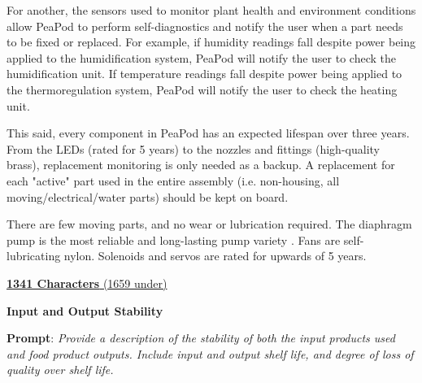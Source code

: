 \documentclass{report}
\begin{document}
For another, the sensors used to monitor plant health and environment conditions allow PeaPod to perform self-diagnostics and notify the user when a part needs to be fixed or replaced. For example, if humidity readings fall despite power being applied to the humidification system, PeaPod will notify the user to check the humidification unit. If temperature readings fall despite power being applied to the thermoregulation system, PeaPod will notify the user to check the heating unit.

This said, every component in PeaPod has an expected lifespan over three years. From the LEDs (rated for 5 years) to the nozzles and fittings (high-quality brass), replacement monitoring is only needed as a backup. A replacement for each "active" part used in the entire assembly (i.e. non-housing, all moving/electrical/water parts) should be kept on board.

There are few moving parts, and no wear or lubrication required. The diaphragm pump is the most reliable and long-lasting pump variety \cite{diaphragm}. Fans are self-lubricating nylon. Solenoids and servos are rated for upwards of 5 years.

\uline{\textbf{1341 Characters} (1659 under)}


\vspace{0.5cm}

\textbf{Input and Output Stability}
\label{sec:reliability-inputoutput}

\textbf{Prompt}: \textit{Provide a description of the stability of both the input products used and food product outputs. Include input and output shelf life, and degree of loss of quality over shelf life.}
\end{document}
